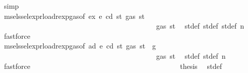 \begin{isabellebody}
\ simp\isanewline
\ \ \ \ \ \ \ \ \ \ \ \ \ \ \ \ \ \ \ \ \ \ \ \ \ \ \ \ \ \ \ \ \ \ \ \ \ \ \isamarkupfalse%
\ \isamarkupfalse%
\ msel{\isacharunderscore}{\kern0pt}ssel{\isacharunderscore}{\kern0pt}expr{\isacharunderscore}{\kern0pt}load{\isacharunderscore}{\kern0pt}rexp{\isacharunderscore}{\kern0pt}gas{\isacharparenleft}{\kern0pt}{}{\isacharparenright}{\kern0pt}{\isacharbrackleft}{\kern0pt}of\ ex\ e\ cd\ st{\isacharprime}{\kern0pt}{\isacharprime}{\kern0pt}\ {\isachardoublequoteopen}gas\ st{\isacharprime}{\kern0pt}{\isacharprime}{\kern0pt}{\isachardoublequoteclose}{\isacharbrackright}{\kern0pt}\isanewline
\ \ \ \ \ \ \ \ \ \ \ \ \ \ \ \ \ \ \ \ \ \ \ \ \ \ \ \ \ \ \ \ \ \ \ \ \ \ \ \ \isamarkupfalse%
\ {\isachardoublequoteopen}{\isasymdots}\ {\isasymle}\ gas\ st{\isacharprime}{\kern0pt}{\isacharprime}{\kern0pt}{\isachardoublequoteclose}\ \isamarkupfalse%
\ st{\isacharprime}{\kern0pt}{\isacharunderscore}{\kern0pt}def\ st{\isacharprime}{\kern0pt}{\isacharprime}{\kern0pt}{\isacharunderscore}{\kern0pt}def\ st{\isacharprime}{\kern0pt}{\isacharprime}{\kern0pt}{\isacharprime}{\kern0pt}{\isacharunderscore}{\kern0pt}def\ n{}\ \isamarkupfalse%
\ fastforce\isanewline
\ \ \ \ \ \ \ \ \ \ \ \ \ \ \ \ \ \ \ \ \ \ \ \ \ \ \ \ \ \ \ \ \ \ \ \ \ \ \isamarkupfalse%
\ \isamarkupfalse%
\ msel{\isacharunderscore}{\kern0pt}ssel{\isacharunderscore}{\kern0pt}expr{\isacharunderscore}{\kern0pt}load{\isacharunderscore}{\kern0pt}rexp{\isacharunderscore}{\kern0pt}gas{\isacharparenleft}{\kern0pt}{}{\isacharparenright}{\kern0pt}{\isacharbrackleft}{\kern0pt}of\ ad\ e\ cd\ st{\isacharprime}{\kern0pt}\ {\isachardoublequoteopen}gas\ st\ {\isacharminus}{\kern0pt}\ g{\isachardoublequoteclose}{\isacharbrackright}{\kern0pt}\isanewline
\ \ \ \ \ \ \ \ \ \ \ \ \ \ \ \ \ \ \ \ \ \ \ \ \ \ \ \ \ \ \ \ \ \ \ \ \ \ \ \ \isamarkupfalse%
\ {\isachardoublequoteopen}{\isasymdots}\ {\isasymle}\ gas\ st{\isacharprime}{\kern0pt}{\isachardoublequoteclose}\ \isamarkupfalse%
\ st{\isacharprime}{\kern0pt}{\isacharunderscore}{\kern0pt}def\ st{\isacharprime}{\kern0pt}{\isacharprime}{\kern0pt}{\isacharunderscore}{\kern0pt}def\ n\ \isamarkupfalse%
\ fastforce\isanewline
\ \ \ \ \ \ \ \ \ \ \ \ \ \ \ \ \ \ \ \ \ \ \ \ \ \ \ \ \ \ \ \ \ \ \ \ \ \ \isamarkupfalse%
\ \isamarkupfalse%
\ {\isacharquery}{\kern0pt}thesis\ \isamarkupfalse%
\ st{\isacharprime}{\kern0pt}{\isacharunderscore}{\kern0pt}def\ \isamarkupfalse%

\end{isabellebody}
